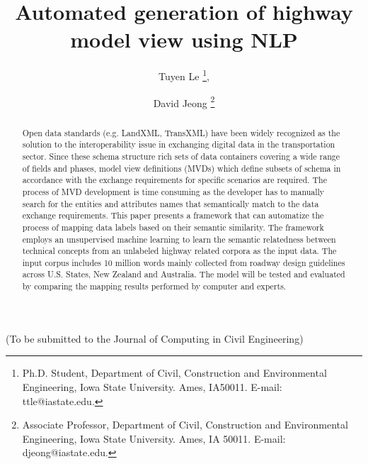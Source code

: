 \documentclass[Journal, InsideFigs, DoubleSpace]{ascelike} %
\begin{document}
% 
\title{Automated generation of highway model view using NLP}
%
\author{
Tuyen Le
\thanks{
Ph.D. Student, Department of Civil, Construction and Environmental Engineering, Iowa State University. Ames, IA50011. E-mail: ttle@iastate.edu.},
\and
David Jeong%
\thanks{Associate Professor, Department of Civil, Construction and Environmental Engineering, Iowa State University. Ames, IA 50011. E-mail: djeong@iastate.edu.}
 }
 
\maketitle
%
\begin{center}
(To be submitted to the Journal of Computing in Civil Engineering) 
\end{center}
%
\begin{abstract} %
Open data standards (e.g. LandXML, TransXML) have been widely recognized as the solution to the interoperability issue in exchanging digital data in the transportation sector. Since these schema structure rich sets of data containers covering a wide range of fields and phases, model view definitions (MVDs) which define subsets of schema in accordance with the exchange requirements for specific scenarios are required. The process of MVD development is time consuming as the developer has to manually search for the entities and attributes names that semantically match to the data exchange requirements. This paper presents a framework that can automatize the process of mapping data labels based on their semantic similarity. The framework employs an unsupervised machine learning to learn the semantic relatedness between technical concepts from an unlabeled highway related corpora as the input data. The input corpus includes 10 million words mainly collected from roadway design guidelines across U.S. States, New Zealand and Australia. The model will be tested and evaluated by comparing the mapping results performed by computer and experts.   
 
\end{abstract}
%
%



\end{document}
